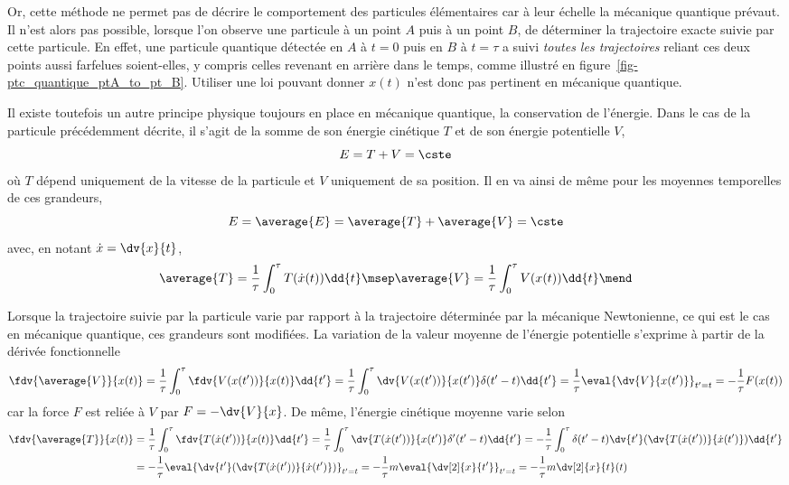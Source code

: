 \par
Or, cette méthode ne permet pas de décrire le comportement des particules élémentaires
car à leur échelle la mécanique quantique prévaut.
Il n'est alors pas possible, lorsque l'on observe une particule à un point $A$ puis à un point $B$, de déterminer la trajectoire exacte suivie par cette particule.
En effet,
une particule quantique détectée
en $A$ à $t=0$ puis en $B$ à $t=\tau$
a suivi \emph{toutes les trajectoires} reliant ces deux points
aussi farfelues soient-elles,
y compris celles revenant en arrière dans le temps,
comme illustré en figure~\ref{fig-ptc_quantique_ptA_to_pt_B}.
Utiliser une loi pouvant donner $x(t)$ n'est donc pas pertinent en mécanique quantique.
\par
Il existe toutefois un autre principe physique toujours en place en mécanique quantique, la conservation de l'énergie.
Dans le cas de la particule précédemment décrite, il s'agit de la somme de son énergie cinétique $T$ et de son énergie potentielle $V$, \ie
\begin{equation}
E = T + V = \cste
\end{equation}
où $T$ dépend uniquement de la vitesse de la particule et $V$ uniquement de sa position. %
Il en va ainsi de même pour les moyennes temporelles de ces grandeurs,
\begin{equation}
E = \average{E} = \average{T} + \average{V} = \cste
\end{equation}
avec, en notant $\dot{x}=\dv{x}{t}$,
\begin{equation}
\average{T} = \frac{1}{\tau}\int_0^\tau T(\dot{x}(t)) \dd{t}
\msep
\average{V} = \frac{1}{\tau}\int_0^\tau V(x(t)) \dd{t}
\mend
\end{equation}
\par
Lorsque la trajectoire suivie par la particule varie par rapport à la trajectoire déterminée par la mécanique Newtonienne, ce qui est le cas en mécanique quantique, ces grandeurs sont modifiées.
La variation de la valeur moyenne de l'énergie potentielle s'exprime à partir de la dérivée fonctionnelle
\begin{equation}
\fdv{\average{V}}{x(t)}
= \frac{1}{\tau}\int_0^\tau \fdv{V(x(t'))}{x(t)} \dd{t'}
= \frac{1}{\tau}\int_0^\tau \dv{V(x(t'))}{x(t')}\delta(t'-t) \dd{t'}
= \frac{1}{\tau}\eval{\dv{V}{x(t')}}_{t'=t}
= -\frac{1}{\tau}F(x(t))
\end{equation}
car la force $F$ est reliée à $V$ par $F = - \dv{V}{x}$.
De même, l'énergie cinétique moyenne varie selon
\begin{align}
\fdv{\average{T}}{x(t)}
&
= \frac{1}{\tau}\int_0^\tau \fdv{T(\dot{x}(t'))}{x(t)} \dd{t'}
=\frac{1}{\tau}\int_0^\tau \dv{T(\dot{x}(t'))}{x(t')}\delta'(t'-t) \dd{t'}
=-\frac{1}{\tau}\int_0^\tau \delta(t'-t) \dv{t'}(\dv{T(\dot{x}(t'))}{\dot{x}(t')}) \dd{t'}
\nonumber
\\&
=-\frac{1}{\tau}\eval{\dv{t'}(\dv{T(\dot{x}(t'))}{\dot{x}(t')})}_{t'=t}
=-\frac{1}{\tau}m\eval{\dv[2]{x}{{t'}}}_{t'=t}
=-\frac{1}{\tau}m{\dv[2]{x}{t}}(t)
\end{align}
